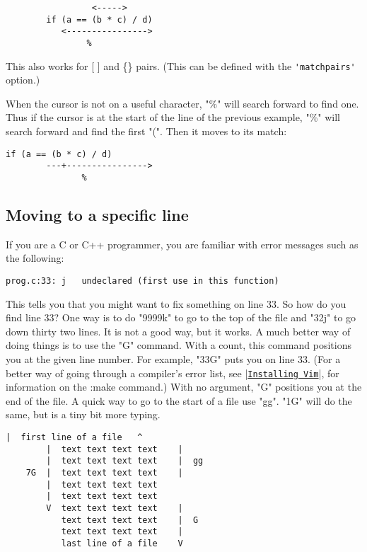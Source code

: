\begin{Verbatim}[samepage=true]
                   %
                 <----->
        if (a == (b * c) / d) 
           <---------------->
                %
\end{Verbatim}

This also works for [ ] and \{\} pairs.
(This can be defined with the \verb!'matchpairs'! option.)

When the cursor is not on a useful character, "\%" will search forward to find one.
Thus if the cursor is at the start of the line of the previous example, "\%" will search forward and find the first "(".
Then it moves to its match:

\begin{Verbatim}[samepage=true]
        if (a == (b * c) / d) 
        ---+---------------->
               %
\end{Verbatim}


\subsection{Moving to a specific line}

If you are a C or C++ programmer, you are familiar with error messages such as the following:

		\begin{Verbatim}[samepage=true]
    prog.c:33: j   undeclared (first use in this function) 
		\end{Verbatim}

This tells you that you might want to fix something on line 33.
So how do you find line 33?  One way is to do "9999k" to go to the top of the file and "32j" to go down thirty two lines.
It is not a good way, but it works.
A much better way of doing things is to use the "G" command.
With a count, this command positions you at the given line number.
For example, "33G" puts you on line 33.
(For a better way of going through a compiler's error list, see |\hyperref[Installing Vim]{\texttt{Installing Vim}}|, for information on the :make command.) With no argument, "G" positions you at the end of the file.
A quick way to go to the start of a file use "gg".
"1G" will do the same, but is a tiny bit more typing.
 
\begin{Verbatim}[samepage=true]
        |  first line of a file   ^
        |  text text text text    |
        |  text text text text    |  gg
    7G  |  text text text text    |
        |  text text text text
        |  text text text text
        V  text text text text    |
           text text text text    |  G
           text text text text    |
           last line of a file    V
\end{Verbatim}


